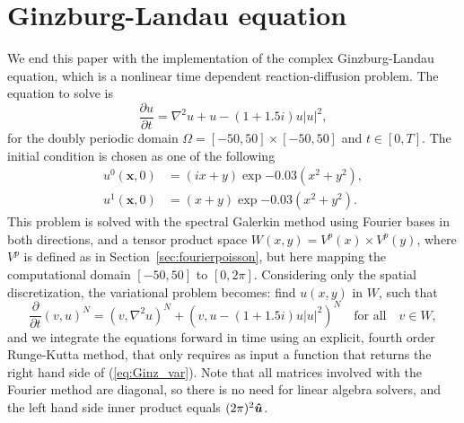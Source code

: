\documentclass[%
oneside,                 %
final,                   %
10pt]{article}
\theoremstyle{definition}
\begin{document}
\section{Ginzburg-Landau equation}
\label{sec:ginzburg}
We end this paper with the implementation of the complex Ginzburg-Landau equation, which is a  nonlinear time dependent reaction-diffusion problem. The equation to solve is 
\begin{equation}
\frac{\partial u}{\partial t} = \nabla^2u + u - (1 + 1.5i)u |u|^2,
\end{equation}
for the doubly periodic domain $\Omega = [-50, 50]\times [-50, 50]$ and  $t \in [0, T]$. The initial condition is chosen as one of the following
\begin{align}
u^0(\boldsymbol{x}, 0) &= (ix + y) \exp {-0.03 (x^2 + y^2)} \label{eq:initial_0}, \\ 
u^1(\boldsymbol{x}, 0) &= (x + y) \exp {-0.03 (x^2 + y^2)} \label{eq:initial_1}.
\end{align}
This problem is solved with the spectral Galerkin method using Fourier bases in both directions, and a tensor product space $W(x,y)=V^p(x) \times V^p(y)$, where $V^p$ is defined as in Section~\ref{sec:fourierpoisson}, but here mapping the computational domain $[-50, 50]$ to $[0, 2\pi]$. Considering only the spatial discretization, the variational problem becomes: find $u(x, y)$ in $W$, such that
\begin{equation}
\frac{\partial }{\partial t} (v, u)^N = (v, \nabla^2u)^N + (v, u - (1 + 1.5i)u |u|^2)^N \quad \text{for all} \quad v \in W, \label{eq:Ginz_var}
\end{equation}
and we integrate the equations forward in time using an explicit, fourth order Runge-Kutta method, that only requires as input a function that returns the right hand side of (\ref{eq:Ginz_var}). Note that all matrices involved with the Fourier method are diagonal, so there is no need for linear algebra solvers, and the left hand side inner product equals $(2 \pi)^2 \boldsymbol{\hat{u}}$.
\end{document}
